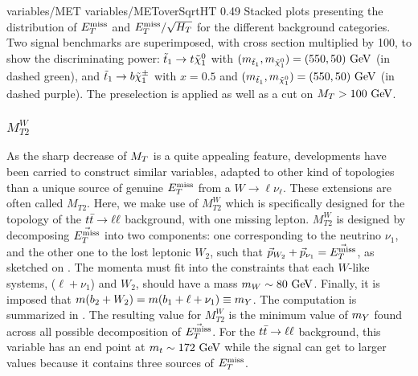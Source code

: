                          {variables/MET}
                         {variables/METoverSqrtHT}
                         {0.49}
                         {Stacked plots presenting the distribution of $E_T^\text{miss}$ and $E_T^\text{miss} /
                         \sqrt{H_T}$ for the different background categories. Two
                         signal benchmarks are superimposed, with cross section multiplied
                         by 100, to show the discriminating power:
                         $\tilde{t}_1 \rightarrow t \tilde{\chi}_1^0$ with $(m_{\tilde{t}_1},m_{\tilde{\chi}_1^0})
                         = (550,50)~\text{GeV}$ (in dashed green), and $\tilde{t}_1 \rightarrow b \tilde{\chi}_1^\pm$
                         with $x = 0.5$ and $(m_{\tilde{t}_1}, m_{\tilde{\chi}_1^0}) = (550,50)~\text{GeV}$
                         (in dashed purple). The preselection is applied as well as a cut
                         on $M_T > 100 ~\text{GeV}$.}

        \subsubsection{$M_{T2}^{W}$}

        As the sharp decrease of $M_T$ is a quite appealing feature, developments have been
        carried \cite{MT2variables} to construct similar variables, adapted to other kind
        of topologies than
        a unique source of genuine $E_T^\text{miss}$ from a $W \rightarrow \ell \nu_\ell$.  These extensions are
        often called $M_{T2}$. Here, we make use of $M_{T2}^W$ which is specifically
        designed for the topology of the $t\bar{t} \rightarrow \ell \ell$ background, with
        one missing lepton. $M_{T2}^W$ is designed by decomposing $\vec{E_T^\text{miss}}$ into two
        components: one corresponding to the neutrino $\nu_1$, and the other one to
        the lost leptonic $W_2$, such that $\vec{p}_{W_2} + \vec{p}_{\nu_1} = \vec{E_T^\text{miss}}$,
        as sketched on .
        The momenta must fit into the constraints that each $W$-like systems, ($\ell + \nu_1$)
        and $W_2$, should have a mass $m_W \sim 80 ~\text{GeV}$. Finally, it is imposed that
        $m(b_2 + W_2) = m(b_1 + \ell + \nu_1) \equiv m_{Y}$. The computation is
        summarized in .
        The resulting value for $M_{T2}^W$ is the minimum value of $m_{Y}$ found across
        all possible decomposition of $\vec{E_T^\text{miss}}$. For the $t\bar{t} \rightarrow \ell \ell$ background,
        this variable has an end point at $m_t \sim 172~\text{GeV}$ while the signal can get to
        larger values because it contains three sources of $E_T^\text{miss}$.

